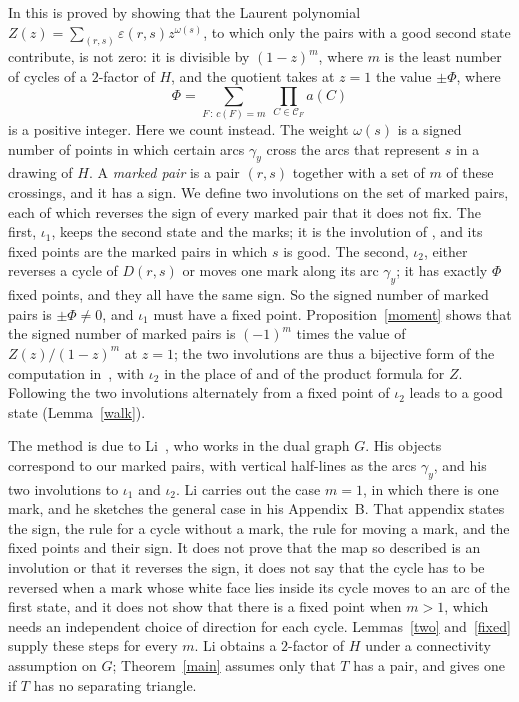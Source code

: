 \documentclass[a4paper]{amsart}
\newcommand{\eps}{\varepsilon}
\begin{document}
In \cite{P} this is proved by showing that the Laurent polynomial $Z(z)=\sum_{(r,s)}\eps(r,s)z^{\omega(s)}$, to which only the pairs with a good second state contribute, is not zero: it is divisible by $(1-z)^m$, where $m$ is the least number of cycles of a $2$-factor of $H$, and the quotient takes at $z=1$ the value $\pm\Phi$, where
\begin{equation}\label{Phi}
\Phi=\sum_{F\,:\,c(F)=m}\ \prod_{C\in\mathcal C_F}a(C)
\end{equation}
is a positive integer.
Here we count instead.
The weight $\omega(s)$ is a signed number of points in which certain arcs $\gamma_y$ cross the arcs that represent $s$ in a drawing of $H$.
A \emph{marked pair} is a pair $(r,s)$ together with a set of $m$ of these crossings, and it has a sign.
We define two involutions on the set of marked pairs, each of which reverses the sign of every marked pair that it does not fix.
The first, $\iota_1$, keeps the second state and the marks; it is the involution of \cite[Lemma~5.6]{P}, and its fixed points are the marked pairs in which $s$ is good.
The second, $\iota_2$, either reverses a cycle of $D(r,s)$ or moves one mark along its arc $\gamma_y$; it has exactly $\Phi$ fixed points, and they all have the same sign.
So the signed number of marked pairs is $\pm\Phi\neq0$, and $\iota_1$ must have a fixed point.
Proposition~\ref{moment} shows that the signed number of marked pairs is $(-1)^m$ times the value of $Z(z)/(1-z)^m$ at $z=1$; the two involutions are thus a bijective form of the computation in~\cite{P}, with $\iota_2$ in the place of \cite[Lemma~6.6]{P} and of the product formula for $Z$.
Following the two involutions alternately from a fixed point of $\iota_2$ leads to a good state (Lemma~\ref{walk}).

The method is due to Li~\cite{Li}, who works in the dual graph $G$.
His objects correspond to our marked pairs, with vertical half-lines as the arcs $\gamma_y$, and his two involutions to $\iota_1$ and $\iota_2$.
Li carries out the case $m=1$, in which there is one mark, and he sketches the general case in his Appendix~B.
That appendix states the sign, the rule for a cycle without a mark, the rule for moving a mark, and the fixed points and their sign.
It does not prove that the map so described is an involution or that it reverses the sign, it does not say that the cycle has to be reversed when a mark whose white face lies inside its cycle moves to an arc of the first state, and it does not show that there is a fixed point when $m>1$, which needs an independent choice of direction for each cycle.
Lemmas~\ref{two} and~\ref{fixed} supply these steps for every $m$.
Li obtains a $2$-factor of $H$ under a connectivity assumption on $G$; Theorem~\ref{main} assumes only that $T$ has a pair, and \cite[Proposition~4.6]{P} gives one if $T$ has no separating triangle.
\end{document}
